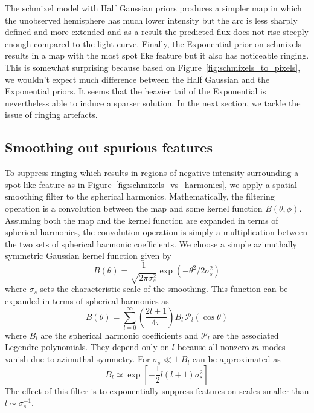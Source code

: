 \documentclass[modern]{aastex62}
\begin{document}
The schmixel model with Half Gaussian priors produces a simpler map in which the unobserved hemisphere has much lower intensity but the arc is less sharply defined and more extended and as a result the predicted flux does not rise steeply enough compared to the light curve.
Finally, the Exponential prior on schmixels results in a map with the most spot like feature but it also has noticeable ringing.
This is somewhat surprising because based on Figure~\ref{fig:schmixels_to_pixels}, we wouldn't expect much difference between the Half Gaussian and the Exponential priors.
It seems that the heavier tail of the Exponential is nevertheless able to induce a sparser solution.
In the next section, we tackle the issue of ringing artefacts.

\subsection{Smoothing out spurious features}
\label{ssec:spurious_features}
To suppress ringing which results in regions of negative intensity surrounding a spot like feature as in Figure~\ref{fig:schmixels_vs_harmonics}, we apply a spatial smoothing filter to the spherical harmonics.
Mathematically, the filtering operation is a convolution between the map and some kernel function $B(\theta,\phi)$.
Assuming both the map and the kernel function are expanded in terms of spherical harmonics, the convolution operation is simply a multiplication between the two sets of spherical harmonic coefficients.
We choose a simple azimuthally symmetric Gaussian kernel function given by
\begin{equation}
    B(\theta)=\frac{1}{\sqrt{2 \pi \sigma_s^{2}}}\exp \left(-\theta^{2} / 2 \sigma_s^{2}\right)
\end{equation}
where $\sigma_s$ sets the characteristic scale of the smoothing.
This function can be expanded in terms of spherical harmonics as
\begin{equation}
    B(\theta)=\sum_{l=0}^{\infty}\left(\frac{2 l+1}{4 \pi}\right) B_{l} \,\mathcal{P}_{l}(\cos \theta)
\end{equation}
where $B_l$ are the spherical harmonic coefficients and $\mathcal{P}_l$ are the associated Legendre polynomials.
They depend only on $l$ because all nonzero $m$ modes vanish due to azimuthal symmetry.
For $\sigma_s\ll 1$ $B_l$ can be approximated as \citep{seon2007,white1995}
\begin{equation}
    B_l\simeq \exp\left[-\frac{1}{2}l(l+1)\sigma_s^2\right]
\end{equation}
The effect of this filter is to exponentially suppress features on scales smaller than $l\sim \sigma_s^{-1}$.
\end{document}
